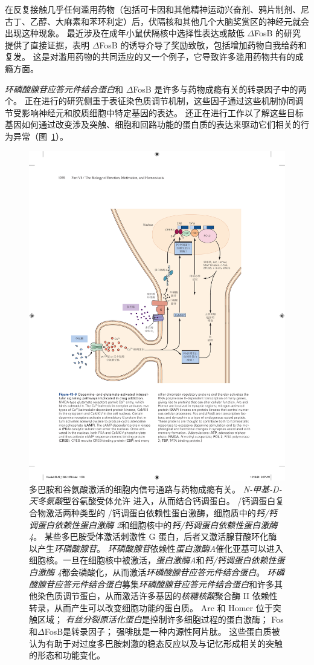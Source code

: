 在反复接触几乎任何滥用药物（包括可卡因和其他精神运动兴奋剂、鸦片制剂、尼古丁、乙醇、大麻素和苯环利定）后，伏隔核和其他几个大脑奖赏区的神经元就会出现这种现象。
最近涉及在成年小鼠伏隔核中选择性表达或敲低 $\Delta$FosB 的研究提供了直接证据，表明 $\Delta$FosB 的诱导介导了奖励致敏，包括增加药物自我给药和复发。
这是对滥用药物的共同适应的又一个例子，它导致许多滥用药物共有的成瘾方面。


\textit{环磷酸腺苷应答元件结合蛋白}和 $\Delta$FosB 是许多与药物成瘾有关的转录因子中的两个。
正在进行的研究侧重于表征染色质调节机制，这些因子通过这些机制协同调节受影响神经元和胶质细胞中特定基因的表达。
还正在进行工作以了解这些目标基因如何通过改变涉及突触、细胞和回路功能的蛋白质的表达来驱动它们相关的行为异常（图~\ref{fig:43_6}）。


\begin{figure}[htbp]
	\centering
	\includegraphics[width=0.8\linewidth]{chap43/fig_43_6}
	\caption{多巴胺和谷氨酸激活的细胞内信号通路与药物成瘾有关。
		\textit{N-甲基-D-天冬氨酸}型谷氨酸受体允许  进入，从而结合钙调蛋白。
		/钙调蛋白复合物激活两种类型的 /钙调蛋白依赖性蛋白激酶，细胞质中的\textit{钙/钙调蛋白依赖性蛋白激酶 2}和细胞核中的\textit{钙/钙调蛋白依赖性蛋白激酶 4}。
		某些多巴胺受体激活刺激性 G 蛋白，后者又激活腺苷酸环化酶以产生\textit{环磷酸腺苷}。
		\textit{环磷酸腺苷}依赖性\textit{蛋白激酶A}催化亚基可以进入细胞核。一旦在细胞核中被激活，\textit{蛋白激酶A}和\textit{钙/钙调蛋白依赖性蛋白激酶 4}都会磷酸化，从而激活\textit{环磷酸腺苷应答元件结合蛋白}。
		\textit{环磷酸腺苷应答元件结合蛋白}募集\textit{环磷酸腺苷应答元件结合蛋白}和许多其他染色质调节蛋白，从而激活许多基因的\textit{核糖核酸}聚合酶 II 依赖性转录，从而产生可以改变细胞功能的蛋白质。
		Arc 和 Homer 位于突触区域；
		\textit{有丝分裂原活化蛋白}是控制许多细胞过程的蛋白激酶；
		Fos和$\Delta$FosB是转录因子；
		强啡肽是一种内源性阿片肽。
		这些蛋白质被认为有助于对过度多巴胺刺激的稳态反应以及与记忆形成相关的突触的形态和功能变化。}
	\label{fig:43_6}
\end{figure}



